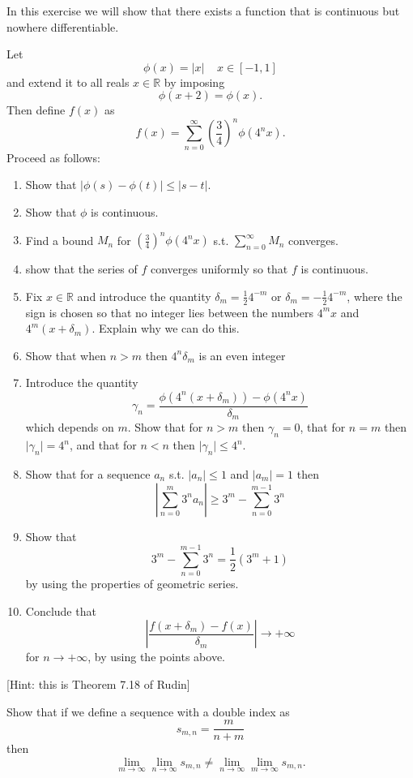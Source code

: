 \documentclass[11pt]{article}%
\newcommand{\R}{\mathbb{R}}
\begin{document}
\begin{Exercise}[title={***}]


In this exercise we will show that there exists a function that is continuous but nowhere differentiable.

Let $$\phi(x)=\vert x\rvert\;\;\;\;x\in[-1,1]$$
and extend it to all reals $x\in\R$ by imposing
$$\phi(x+2) = \phi(x).$$
Then define $f(x)$ as 
$$f(x)=\sum_{n=0}^{\infty}\left(\frac{3}{4}\right)^n\phi(4^n x).$$
Proceed as follows:
\begin{enumerate}
	\item Show that $\rvert\phi(s)-\phi(t)\lvert \leq \lvert s-t \rvert$.
	\item Show that $\phi$ is continuous.
	\item Find a bound $M_n$ for $\left(\frac{3}{4}\right)^n\phi(4^n x)$ s.t. $\sum_{n=0}^{\infty}M_n$ converges.
	\item show that the series of $f$ converges uniformly so that $f$ is continuous.
	\item Fix $x\in\R$ and introduce the quantity $\delta_m = \frac{1}{2}4^{-m}$ or $\delta_m = -\frac{1}{2}4^{-m}$, where the sign is chosen so that no integer lies between the numbers $4^m x$ and $4^m (x+\delta_m)$. Explain why we can do this.
	\item Show that when $n>m$ then $4^n\delta_m$ is an even integer
	\item Introduce the quantity $$\gamma_n = \frac{\phi(4^n(x+\delta_m))-\phi(4^n x)}{\delta_m}$$ which depends on $m$. Show that for $n>m$ then $\gamma_n=0$, that for $n=m$ then  $\lvert\gamma_n\rvert=4^n$, and that for $n<n$ then  $\lvert\gamma_n\rvert\leq4^n$.
	\item Show that for a sequence $a_n$ s.t. $\lvert a_n\rvert\leq1$ and $\lvert a_m\rvert =1$ then $$\left\lvert\sum_{n=0}^m 3^n a_n\right\rvert \geq 3^m - \sum_{n=0}^{m-1} 3^n$$
	\item Show that $$3^m - \sum_{n=0}^{m-1} 3^n = \frac{1}{2}(3^m+1)$$ by using the properties of geometric series.
	\item Conclude that $$\left\lvert\frac{f(x+\delta_m)-f(x)}{\delta_m}\right\rvert\to +\infty$$ for ${n\to+\infty}$, by using the points above.
	
\end{enumerate}

[Hint: this is Theorem 7.18 of Rudin]
\end{Exercise}

\begin{Exercise} [title={*$\dagger$}]
	Show that if we define a sequence with a double index as $$s_{m,n} = \frac{m}{n+m}$$ then
	$$\lim_{m\to\infty}\lim_{n\to\infty} s_{m,n} \neq \lim_{n\to\infty}\lim_{m\to\infty} s_{m,n}.$$
\end{Exercise}
\end{document}
